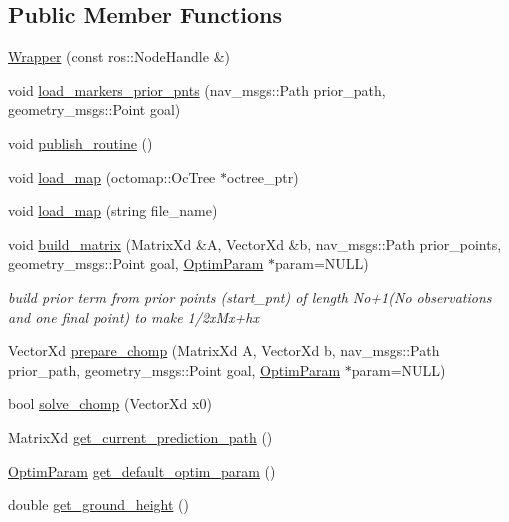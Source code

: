 \subsection*{Public Member Functions}
\begin{DoxyCompactItemize}
\item 
\hyperlink{class_c_h_o_m_p_1_1_wrapper_a6eb8cdd0f948a2a5e698c66e890e8e0e}{Wrapper} (const ros\+::\+Node\+Handle \&)
\item 
void \hyperlink{class_c_h_o_m_p_1_1_wrapper_a6ddf801481c8cb4d567ea7cb073a819b}{load\+\_\+markers\+\_\+prior\+\_\+pnts} (nav\+\_\+msgs\+::\+Path prior\+\_\+path, geometry\+\_\+msgs\+::\+Point goal)
\item 
void \hyperlink{class_c_h_o_m_p_1_1_wrapper_a84f5c4690636e65aca526e6e5b8abcf4}{publish\+\_\+routine} ()
\item 
void \hyperlink{class_c_h_o_m_p_1_1_wrapper_a095c001d0a11f0fa4229e38f602e5931}{load\+\_\+map} (octomap\+::\+Oc\+Tree $\ast$octree\+\_\+ptr)
\item 
void \hyperlink{class_c_h_o_m_p_1_1_wrapper_a93b14d4809f5bf3170473fc10a93a755}{load\+\_\+map} (string file\+\_\+name)
\item 
void \hyperlink{class_c_h_o_m_p_1_1_wrapper_ab51d0a655ed4b03ca3225c0af737f2dc}{build\+\_\+matrix} (Matrix\+Xd \&A, Vector\+Xd \&b, nav\+\_\+msgs\+::\+Path prior\+\_\+points, geometry\+\_\+msgs\+::\+Point goal, \hyperlink{struct_c_h_o_m_p_1_1_optim_param}{Optim\+Param} $\ast$param=N\+U\+LL)
\begin{DoxyCompactList}\small\item\em build prior term from prior points (start\+\_\+pnt) of length No+1(No observations and one final point) to make 1/2x\textquotesingle{}Mx+hx \end{DoxyCompactList}\item 
Vector\+Xd \hyperlink{class_c_h_o_m_p_1_1_wrapper_a138ac0d5088055c3698d93bbf9432126}{prepare\+\_\+chomp} (Matrix\+Xd A, Vector\+Xd b, nav\+\_\+msgs\+::\+Path prior\+\_\+path, geometry\+\_\+msgs\+::\+Point goal, \hyperlink{struct_c_h_o_m_p_1_1_optim_param}{Optim\+Param} $\ast$param=N\+U\+LL)
\item 
bool \hyperlink{class_c_h_o_m_p_1_1_wrapper_ac8fa793a31b7872feccc711c55c1da20}{solve\+\_\+chomp} (Vector\+Xd x0)
\item 
Matrix\+Xd \hyperlink{class_c_h_o_m_p_1_1_wrapper_ae94071b38bb2cd68d4a281c9f93e9587}{get\+\_\+current\+\_\+prediction\+\_\+path} ()
\item 
\hyperlink{struct_c_h_o_m_p_1_1_optim_param}{Optim\+Param} \hyperlink{class_c_h_o_m_p_1_1_wrapper_ac31da0a2c980d5b64541852f01deebbf}{get\+\_\+default\+\_\+optim\+\_\+param} ()
\item 
double \hyperlink{class_c_h_o_m_p_1_1_wrapper_aa4af50daa2bae57af10cdd344571c5af}{get\+\_\+ground\+\_\+height} ()
\end{DoxyCompactItemize}
